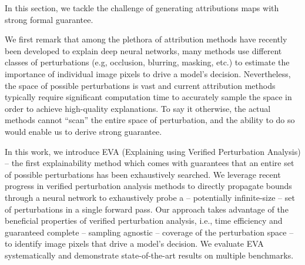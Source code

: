 \newcommand{\lowerf}{\f_{\text{min}}}
\newcommand{\upperf}{\f_{\text{max}}}
\newcommand{\evaEmp}{\eva\textsubscript{emp}}
\newcommand{\evaH}{\eva\textsubscript{hybrid}}
\newcommand{\adv}{\textit{adversarial overlap}}
\newcommand{\AO}{\textit{AO}}
\newcommand{\AOup}{\overline{\textit{AO}}}
\newcommand{\AOemp}{\hat{\textit{AO}}}
\newcommand{\Adv}{\textit{Adversarial overlap}}

\newcommand{\ballu}{\ball_{\bm{u}}}

\newcommand{\rsr}{{Robustness\text{-}S\textsubscript{r}}}

In this section, we tackle the challenge of generating attributions maps with strong formal guarantee. 

We first remark that among the  plethora of attribution methods have recently been developed to explain deep neural networks, many methods use different classes of perturbations (e.g, occlusion, blurring, masking, etc.) to estimate the importance of individual image pixels to drive a model's decision.
Nevertheless, the space of possible perturbations is vast and current attribution methods typically require significant computation time to accurately sample the space in order to achieve high-quality explanations. To say it otherwise, the actual methods cannot ``scan'' the entire space of perturbation, and the ability to do so would enable us to derive strong guarantee.

In this work, we introduce EVA (Explaining using Verified Perturbation Analysis) -- the first explainability method which comes with guarantees that an entire set of possible perturbations has been exhaustively searched. We leverage recent progress in verified perturbation analysis methods to directly propagate bounds through a neural network to exhaustively probe a -- potentially infinite-size --  set of perturbations in a single forward pass. Our approach takes advantage of the beneficial properties of verified perturbation analysis, i.e., time efficiency and guaranteed complete -- sampling agnostic -- coverage of the perturbation space -- to identify image pixels that drive a model's decision. 
We  evaluate EVA systematically and demonstrate state-of-the-art results on multiple benchmarks.

